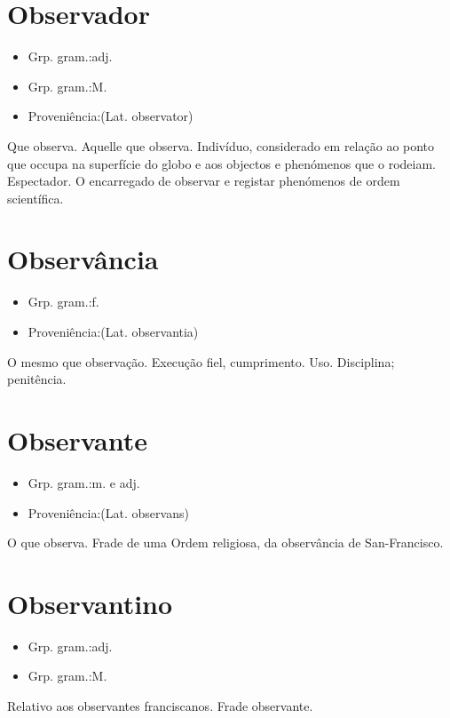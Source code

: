 \section{Observador}
\begin{itemize}
\item {Grp. gram.:adj.}
\end{itemize}
\begin{itemize}
\item {Grp. gram.:M.}
\end{itemize}
\begin{itemize}
\item {Proveniência:(Lat. \textunderscore observator\textunderscore )}
\end{itemize}
Que observa.
Aquelle que observa.
Indivíduo, considerado em relação ao ponto que occupa na superfície do globo e aos objectos e phenómenos que o rodeiam.
Espectador.
O encarregado de observar e registar phenómenos de ordem scientífica.
\section{Observância}
\begin{itemize}
\item {Grp. gram.:f.}
\end{itemize}
\begin{itemize}
\item {Proveniência:(Lat. \textunderscore observantia\textunderscore )}
\end{itemize}
O mesmo que \textunderscore observação\textunderscore .
Execução fiel, cumprimento.
Uso.
Disciplina; penitência.
\section{Observante}
\begin{itemize}
\item {Grp. gram.:m.  e  adj.}
\end{itemize}
\begin{itemize}
\item {Proveniência:(Lat. \textunderscore observans\textunderscore )}
\end{itemize}
O que observa.
Frade de uma Ordem religiosa, da observância de San-Francisco.
\section{Observantino}
\begin{itemize}
\item {Grp. gram.:adj.}
\end{itemize}
\begin{itemize}
\item {Grp. gram.:M.}
\end{itemize}
Relativo aos observantes franciscanos.
Frade observante.
